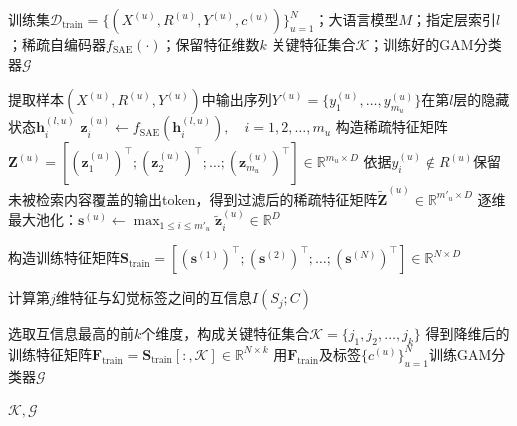 \begin{algorithm}[htbp]
\caption{SKID算法（训练阶段）}
\label{alg:skid_train}
\begin{algorithmic}[1]
\Require 训练集$\mathcal{D}_{\mathrm{train}}=\{(X^{(u)},R^{(u)},Y^{(u)},c^{(u)})\}_{u=1}^{N}$；大语言模型$M$；指定层索引$l$；稀疏自编码器$f_{\mathrm{SAE}}(\cdot)$；保留特征维数$k$
\Ensure 关键特征集合$\mathcal{K}$；训练好的GAM分类器$\mathcal{G}$

    \State 提取样本$(X^{(u)},R^{(u)},Y^{(u)})$中输出序列$Y^{(u)}=\{y^{(u)}_1,\dots,y^{(u)}_{m_u}\}$在第$l$层的隐藏状态$\mathbf{h}^{(l,u)}_i$
    \State $\mathbf{z}^{(u)}_i \gets f_{\mathrm{SAE}}(\mathbf{h}^{(l,u)}_i),\quad i=1,2,\dots,m_u$
    \State 构造稀疏特征矩阵$\mathbf{Z}^{(u)}=[(\mathbf{z}^{(u)}_1)^\top;(\mathbf{z}^{(u)}_2)^\top;\dots;(\mathbf{z}^{(u)}_{m_u})^\top]\in\mathbb{R}^{m_u\times D}$
    \State 依据$y^{(u)}_i\notin R^{(u)}$保留未被检索内容覆盖的输出token，得到过滤后的稀疏特征矩阵$\widetilde{\mathbf{Z}}^{(u)}\in\mathbb{R}^{m'_u\times D}$
    \State 逐维最大池化：$\mathbf{s}^{(u)}\gets \max_{1\leq i\leq m'_u}\widetilde{\mathbf{z}}^{(u)}_i\in\mathbb{R}^{D}$
\EndFor

\State 构造训练特征矩阵$\mathbf{S}_{\mathrm{train}}=[(\mathbf{s}^{(1)})^\top;(\mathbf{s}^{(2)})^\top;\dots;(\mathbf{s}^{(N)})^\top]\in\mathbb{R}^{N\times D}$

    \State 计算第$j$维特征与幻觉标签之间的互信息$I(S_j;C)$
\EndFor

\State 选取互信息最高的前$k$个维度，构成关键特征集合$\mathcal{K}=\{j_1,j_2,\dots,j_k\}$
\State 得到降维后的训练特征矩阵$\mathbf{F}_{\mathrm{train}}=\mathbf{S}_{\mathrm{train}}\left [:, \mathcal{K}\right ]\in\mathbb{R}^{N\times k}$
\State 用$\mathbf{F}_{\mathrm{train}}$及标签$\{c^{(u)}\}_{u=1}^{N}$训练GAM分类器$\mathcal{G}$

\State \Return $\mathcal{K},\mathcal{G}$
\end{algorithmic}
\end{algorithm}

